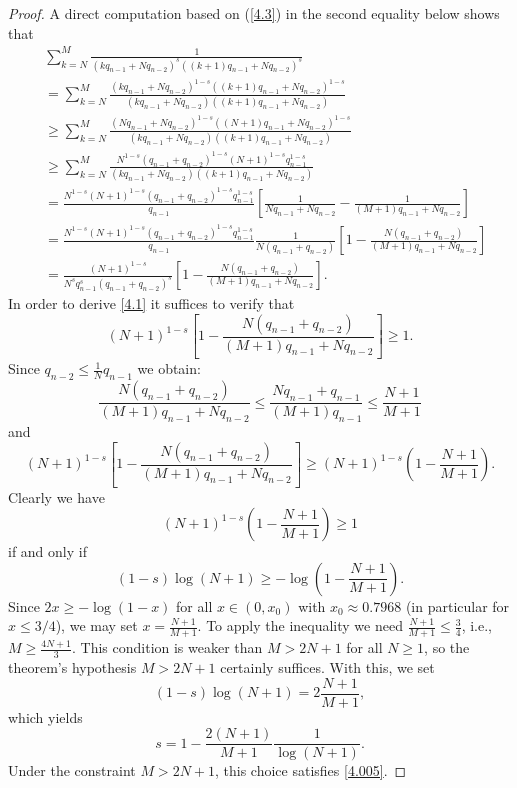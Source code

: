 \documentclass[12pt]{article}
\numberwithin{equation}{section}
\begin{document}
\begin{proof}
A direct computation based on (\ref{4.3}) in the second equality below shows that 
%
\begin{align*}
& \sum_{k=N}^{M} \frac{1}{\left(kq_{n-1} + {Nq_{n-2}}\right)^s\left((k+1)q_{n-1} + {Nq_{n-2}}\right)^s} \\
&=
\sum_{k=N}^{M} \frac{\left(kq_{n-1} + {Nq_{n-2}}\right)^{1-s}\left((k+1)q_{n-1} + {Nq_{n-2}}\right)^{1-s}}{\left(kq_{n-1} + {Nq_{n-2}}\right)\left((k+1)q_{n-1} + {Nq_{n-2}}\right)} \\
& \ge 
\sum_{k=N}^{M} \frac{\left(Nq_{n-1} + {Nq_{n-2}}\right)^{1-s}\left((N+1)q_{n-1} + {Nq_{n-2}}\right)^{1-s}}{\left(kq_{n-1} + {Nq_{n-2}}\right)\left((k+1)q_{n-1} + {Nq_{n-2}}\right)} \\
& \ge 
\sum_{k=N}^{M} \frac{N^{1-s} \left(q_{n-1} + {q_{n-2}}\right)^{1-s} (N+1)^{1-s}q_{n-1}^{1-s} }{\left(kq_{n-1} + {Nq_{n-2}}\right)\left((k+1)q_{n-1} + {Nq_{n-2}}\right)} \\
&=\frac{N^{1-s} (N+1)^{1-s} \left(q_{n-1} + {q_{n-2}}\right)^{1-s} q_{n-1}^{1-s} }{q_{n-1}} \left[ \frac{1}{Nq_{n-1} + {Nq_{n-2}}} - \frac{1}{(M+1)q_{n-1} + {Nq_{n-2}}} \right] \\
& = \frac{N^{1-s} (N+1)^{1-s} \left(q_{n-1} + {q_{n-2}}\right)^{1-s} q_{n-1}^{1-s} }{q_{n-1}} \frac{1}{N(q_{n-1}+q_{n-2})} \left[ 1 - \frac{N(q_{n-1}+q_{n-2})}{(M+1)q_{n-1} + {Nq_{n-2}}} \right] \\
& = \frac{ (N+1)^{1-s}}{N^{s} q^s_{n-1}\left(q_{n-1} + {q_{n-2}}\right)^{s}} 
\left[ 1 - \frac{N(q_{n-1}+q_{n-2})}{(M+1)q_{n-1} + {Nq_{n-2}}} \right]. 
\end{align*}
%
In order to derive \eqref{4.1} it suffices to verify that  
%
\begin{equation} \label{4.005}
(N+1)^{1-s} \left[ 1 - \frac{N(q_{n-1}+q_{n-2})}{(M+1)q_{n-1} + {Nq_{n-2}}} \right] \ge 1.     
\end{equation}
%
Since $q_{n-2} \le \frac{1}{N} q_{n-1}$ we obtain: 
\[
\frac{N(q_{n-1}+q_{n-2})}{(M+1)q_{n-1} + {Nq_{n-2}}} \le \frac{Nq_{n-1}+q_{n-1}}{(M+1)q_{n-1}} \le \frac{N+1}{M+1}
\]
and
\[
(N+1)^{1-s} \left[ 1 - \frac{N(q_{n-1}+q_{n-2})}{(M+1)q_{n-1} + {Nq_{n-2}}} \right] \ge (N+1)^{1-s} \left( 1 - \frac{N+1}{M+1}\right).
\]
%
Clearly we have 
\[
(N+1)^{1-s} \left( 1 - \frac{N+1}{M+1}\right) \ge 1
\]
if and only if 
\[
(1-s) \log (N+1) \ge - \log\left( 1 - \frac{N+1}{M+1}\right). 
\]
%
{Since $2x \ge -\log(1-x)$ for all $x \in (0, x_0)$ with $x_0 \approx 0.7968$ (in particular for $x \le 3/4$), we may set $x = \frac{N+1}{M+1}$. To apply the inequality we need $\frac{N+1}{M+1} \le \frac{3}{4}$, i.e., $M \ge \frac{4N+1}{3}$. This condition is weaker than $M > 2N+1$ for all $N \ge 1$, so the theorem's hypothesis $M > 2N+1$ certainly suffices.
With this,} we set
\[
(1-s) \log (N+1) = 2 \frac{N+1}{M+1},
\]
which yields
\[
s = 1 - \frac{2(N+1)}{M+1} \frac{1}{\log(N+1)}.
\]
Under the constraint $M > 2N+1$, this choice satisfies \eqref{4.005}.
\end{proof}
\end{document}
